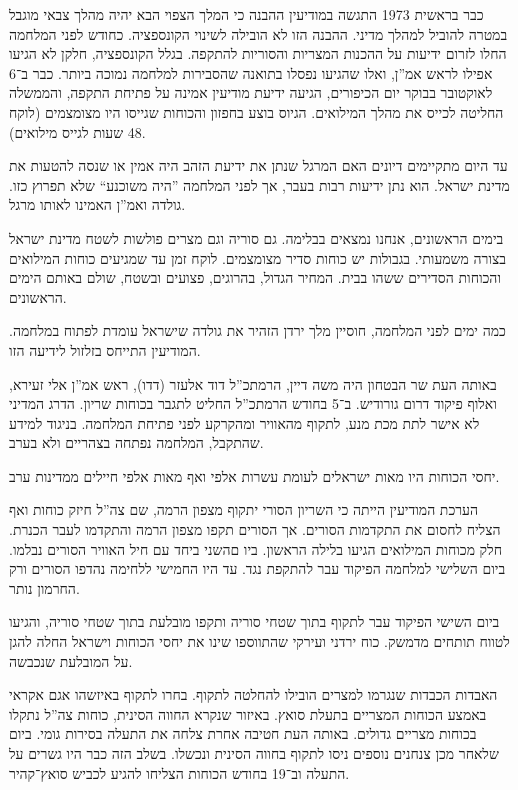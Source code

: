 \documentclass[]{../../../../tex/classes/styledArticle}
\begin{document}
	כבר בראשית 1973 התגשה במודיעין ההבנה כי המלך הצפוי הבא יהיה מהלך צבאי מוגבל במטרה להוביל למהלך מדיני. ההבנה הזו לא הובילה לשינוי הקונספציה. כחודש לפני המלחמה החלו לזרום ידיעות על ההכנות המצריות והסוריות להתקפה. בגלל הקונספציה, חלקן לא הגיעו אפילו לראש אמ''ן, ואלו שהגיעו נפסלו בתואנה שהסבירות למלחמה נמוכה ביותר. כבר ב־6 לאוקטובר בבוקר יום הכיפורים, הגיעה ידיעת מודיעין אמינה על פתיחת התקפה, והממשלה החליטה לכייס את מהלך המילואים. הגיוס בוצע בחפזון והכוחות שגייסו היו מצומצמים (לוקח 48 שעות לגייס מילואים). 
	
	עד היום מתקיימים דיונים האם המרגל שנתן את ידיעת הזהב היה אמין או שנסה להטעות את מדינת ישראל. הוא נתן ידיעות רבות בעבר, אך לפני המלחמה ''היה משוכנע`` שלא תפרוץ כזו. גולדה ואמ''ן האמינו לאותו מרגל. 
	
	בימים הראשונים, אנחנו נמצאים בבלימה. גם סוריה וגם מצרים פולשות לשטח מדינת ישראל בצורה משמעותי. בגבולות יש כוחות סדיר מצומצמים. לוקח זמן עד שמגיעים כוחות המילואים והכוחות הסדירים ששהו בבית. המחיר הגדול, בהרוגים, פצועים ובשטח, שולם באותם הימים הראשונים. 
	
	כמה ימים לפני המלחמה, חוסיין מלך ירדן הזהיר את גולדה שישראל עומדת לפתוח במלחמה. המודיעין התייחס בזלזול לידיעה הזו. 
	
	באותה העת שר הבטחון היה משה דיין, הרמתכ''ל דוד אלעזר (דדו), ראש אמ''ן אלי זעירא, ואלוף פיקוד דרום גורודיש. ב־5 בחודש הרמתכ''ל החליט לתגבר בכוחות שריון. הדרג המדיני לא אישר לתת מכת מנע, לתקוף מהאוויר ומהקרקע לפני פתיחת המלחמה. בניגוד למידע שהתקבל, המלחמה נפתחה בצהריים ולא בערב. 
	
	יחסי הכוחות היו מאות ישראלים לעומת עשרות אלפי ואף מאות אלפי חיילים ממדינות ערב. 
	
	הערכת המודיעין הייתה כי השריון הסורי יתקוף מצפון הרמה, שם צה''ל חיזק כוחות ואף הצליח לחסום את התקדמות הסורים. אך הסורים תקפו מצפון הרמה והתקדמו לעבר הכנרת. חלק מכוחות המילואים הגיעו בלילה הראשון. ביו םהשני ביחד עם חיל האוויר הסורים נבלמו. ביום השלישי למלחמה הפיקוד עבר להתקפת נגד. עד היו החמישי ללחימה נהדפו הסורים ורק החרמון נותר. 
	
	ביום השישי הפיקוד עבר לתקוף בתוך שטחי סוריה ותקפו מובלעת בתוך שטחי סוריה, והגיעו לטווח תותחים מדמשק. כוח ירדני ועירקי שהתווספו שינו את יחסי הכוחות וישראל החלה להגן על המובלעת שנכבשה. 
	
	האבדות הכבדות שנגרמו למצרים הובילו להחלטה לתקוף. בחרו לתקוף באיזשהו אגם אקראי באמצע הכוחות המצריים בתעלת סואץ. באיזור שנקרא החווה הסינית, כוחות צה''ל נתקלו בכוחות מצריים גדולים. באותה העת חטיבה אחרת צלחה את התעלה בסירות גומי. ביום שלאחר מכן צנחנים נוספים ניסו לתקוף בחווה הסינית ונכשלו. בשלב הזה כבר היו גשרים על התעלה וב־19 בחודש הכוחות הצליחו להגיע לכביש סואץ־קהיר. 
	
\end{document}
